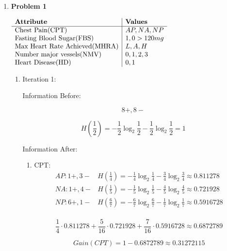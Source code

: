 \begin{enumerate}

	\item{\bf{Problem 1}}
	
		\(
		\begin{array}{l|l}
			\text{\bf{Attribute}} & \text{\bf{Values}} \\
			\hline
			\text{Chest Pain(CPT)} & AP, NA, NP \\
			\text{Fasting Blood Sugar(FBS)} & 1,0 > 120mg \\
			\text{Max Heart Rate Achieved(MHRA)} & L, A, H \\
			\text{Number major vessels(NMV)} & 0, 1, 2, 3 \\
			\text{Heart Disease(HD)} & 0, 1 \\
		\end{array}
		\)

		\begin{enumerate}
			\item{Iteration 1:}
				
				Information Before:
				
				\[
					8+,8-
				\]
				
				\[
					H(\frac{1}{2}) = - \frac{1}{2} \log_2 \frac{1}{2} - \frac{1}{2} \log_2 \frac{1}{2} = 1
				\]
			
				Information After:
				
				\begin{enumerate}
				
					\item{CPT:} \\
					
						\[
							\begin{array}{l|l}
								AP: 1+, 3- & H(\frac{1}{4}) = - \frac{1}{4} \log_2 \frac{1}{4} - \frac{3}{4} \log_2 \frac{3}{4} \approx 0.811278 \\
								NA: 1+, 4- & H(\frac{1}{5}) = - \frac{1}{5} \log_2 \frac{1}{5} - \frac{4}{5} \log_2 \frac{4}{5} \approx 0.721928 \\
								NP: 6+, 1- & H(\frac{6}{7}) = - \frac{6}{7} \log_2 \frac{6}{7} - \frac{1}{7} \log_2 \frac{1}{7} \approx 0.5916728 \\
							\end{array}
						\] 
						
						\[
							\frac{1}{4} \cdot 0.811278 + \frac{5}{16} \cdot 0.721928 + \frac{7}{16} \cdot 0.5916728 \approx 0.6872789
						\]
						
						\[
							Gain(CPT) = 1 - 0.6872789 \approx 0.31272115
						\]
					

\end{enumerate}
\end{enumerate}
\end{enumerate}
